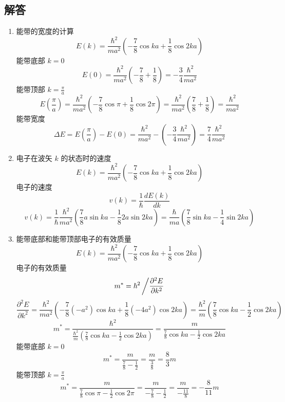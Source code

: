 \documentclass[12pt, a4paper]{article}
\begin{document}
\subsection*{解答}
\begin{enumerate}
    \item 能带的宽度的计算
    \[
    E(k) = \frac{\hbar^2}{ma^2} \left( -\frac{7}{8} \cos ka + \frac{1}{8} \cos 2ka \right)
    \]
    能带底部 \(k = 0\)
    \[
    E(0) = \frac{\hbar^2}{ma^2} \left( -\frac{7}{8} + \frac{1}{8} \right) = -\frac{3}{4} \frac{\hbar^2}{ma^2}
    \]
    能带顶部 \(k = \frac{\pi}{a}\)
    \[
    E\left(\frac{\pi}{a}\right) = \frac{\hbar^2}{ma^2} \left( -\frac{7}{8} \cos \pi + \frac{1}{8} \cos 2\pi \right) = \frac{\hbar^2}{ma^2} \left( \frac{7}{8} + \frac{1}{8} \right) = \frac{\hbar^2}{ma^2}
    \]
    能带宽度
    \[
    \Delta E = E\left(\frac{\pi}{a}\right) - E(0) = \frac{\hbar^2}{ma^2} - \left(-\frac{3}{4} \frac{\hbar^2}{ma^2}\right) = \frac{7}{4} \frac{\hbar^2}{ma^2}
    \]
    \item 电子在波矢 \(k\) 的状态时的速度
    \[
    E(k) = \frac{\hbar^2}{ma^2} \left( -\frac{7}{8} \cos ka + \frac{1}{8} \cos 2ka \right)
    \]
    电子的速度
    \[
    v(k) = \frac{1}{\hbar} \frac{dE(k)}{dk}
    \]
    \[
    v(k) = \frac{1}{\hbar} \frac{\hbar^2}{ma^2} \left( \frac{7}{8} a \sin ka - \frac{1}{8} 2a \sin 2ka \right) = \frac{\hbar}{ma} \left( \frac{7}{8} \sin ka - \frac{1}{4} \sin 2ka \right)
    \]
    \item 能带底部和能带顶部电子的有效质量
    \[
    E(k) = \frac{\hbar^2}{ma^2} \left( -\frac{7}{8} \cos ka + \frac{1}{8} \cos 2ka \right)
    \]
    电子的有效质量
    \[
    m^* = \hbar^2 \left/ \frac{\partial^2 E}{\partial k^2} \right.
    \]
    \[
    \frac{\partial^2 E}{\partial k^2} = \frac{\hbar^2}{ma^2} \left( -\frac{7}{8} (-a^2) \cos ka + \frac{1}{8} (-4a^2) \cos 2ka \right) = \frac{\hbar^2}{m} \left( \frac{7}{8} \cos ka - \frac{1}{2} \cos 2ka \right)
    \]
    \[
    m^* = \frac{\hbar^2}{\frac{\hbar^2}{m} \left( \frac{7}{8} \cos ka - \frac{1}{2} \cos 2ka \right)} = \frac{m}{\frac{7}{8} \cos ka - \frac{1}{2} \cos 2ka}
    \]
    能带底部 \(k = 0\)
    \[
    m^* = \frac{m}{\frac{7}{8} - \frac{1}{2}} = \frac{m}{\frac{3}{8}} = \frac{8}{3} m
    \]
    能带顶部 \(k = \frac{\pi}{a}\)
    \[
    m^* = \frac{m}{\frac{7}{8} \cos \pi - \frac{1}{2} \cos 2\pi} = \frac{m}{-\frac{7}{8} - \frac{1}{2}} = \frac{m}{-\frac{11}{8}} = -\frac{8}{11} m
    \]
\end{enumerate}
\end{document}
